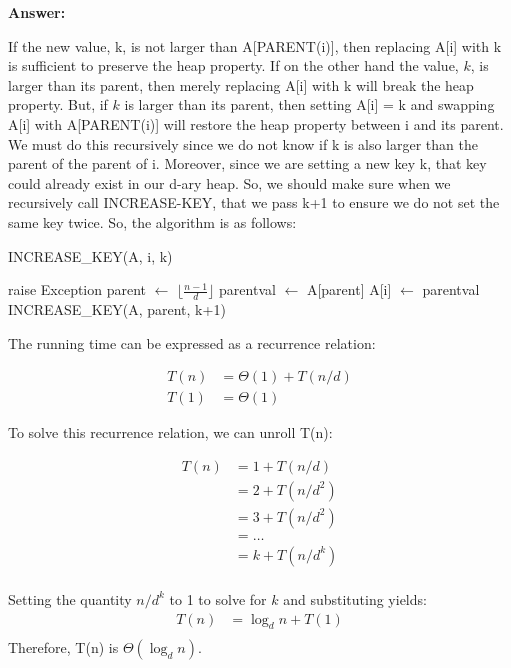 \documentclass[]{book}
\theoremstyle{definition}
\begin{document}
\begin{enumerate}
    \textbf{Answer:} 
    
    If the new value, k, is
    not larger than A[PARENT(i)], then replacing A[i] with k is sufficient to preserve the
    heap property. If on the other hand the value, $k$, is larger than its
    parent, then merely replacing A[i] with k will break the heap property.
    But, if $k$ is larger
    than its parent, then setting A[i] = k and swapping A[i] with A[PARENT(i)] will restore
    the heap property between i and its parent. We must do this recursively since
    we do not know if k is also larger than the parent of the parent of i.
    Moreover, since we are setting a new key k, that key could already exist
    in our d-ary heap. So, we should make sure when we recursively call INCREASE-KEY,
    that we pass k+1 to ensure we do not set the same key twice. So, the algorithm is as follows:
    
    \begin{algorithm}[h]
    \caption{INCREASE\_KEY(A, i, k)}
    \begin{algorithmic}[1]
        \STATE raise Exception
    \ENDIF
    \STATE parent $\leftarrow$ $ \lfloor \frac{n - 1}{d} \rfloor$
    \STATE parentval $\leftarrow$ A[parent]
        \STATE A[i] $\leftarrow$ parentval
        \STATE INCREASE\_KEY(A, parent, k+1)
    \ENDIF
    \end{algorithmic}
    \end{algorithm}

    The running time can be expressed as a recurrence relation:

    \begin{align*}
        T(n) &= \Theta(1) + T(n/d) \\
        T(1) &= \Theta(1)
    \end{align*}

    To solve this recurrence relation, we can unroll T(n):

    \begin{align*}
        T(n) &= 1 + T(n/d) \\
             &= 2 + T(n/d^2) \\
             &= 3 + T(n/d^2) \\
             &= \dots \\
             &= k + T(n/d^k) \\
    \end{align*}

    Setting the quantity $n/d^k$ to 1 to solve for $k$ and substituting yields:
    \begin{align*}
        T(n) &= \log_d n + T(1) \\
    \end{align*}
    Therefore, T(n) is $\Theta(\log_d n)$.

\end{enumerate}
\end{document}
